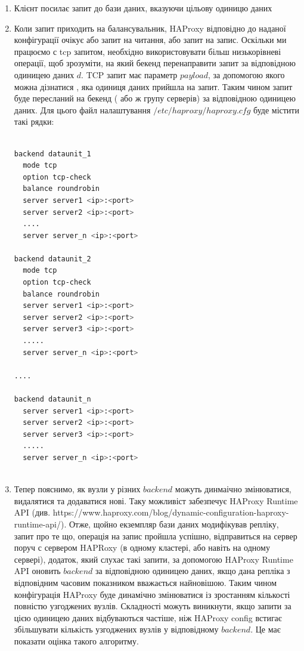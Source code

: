 \documentclass[14pt]{vakthesis}
\begin{document}
\begin{enumerate}

\item Клієнт посилає запит до бази даних, вказуючи цільову одиницю даних
\item Коли запит приходить на балансувальник, HAProxy відповідно до наданої конфігурації очікує або запит на читання, або запит на запис. Оскільки ми працюємо  с tcp запитом, необхідно використовувати більш низькорівневі операції, щоб зрозуміти, на який бекенд перенаправити запит за відповідною одиницею даних $d$. TCP запит має параметр $payload$, за допомогою якого можна дізнатися , яка одиниця даних прийшла на запит. Таким чином запит буде пересланий на бекенд (
або ж групу серверів) за відповідною одиницею даних. Для цього файл налаштування $/etc/haproxy/haproxy.cfg$ буде містити такі рядки: 

\begin{lstlisting}[language=bash,caption={bash version}]

backend dataunit_1
  mode tcp
  option tcp-check
  balance roundrobin
  server server1 <ip>:<port>
  server server2 <ip>:<port>
  ....
  server server_n <ip>:<port>

backend dataunit_2
  mode tcp
  option tcp-check
  balance roundrobin
  server server1 <ip>:<port>
  server server2 <ip>:<port>
  server server3 <ip>:<port>
  .....
  server server_n <ip>:<port>
 
....

backend dataunit_n
  server server1 <ip>:<port>
  server server2 <ip>:<port>
  server server3 <ip>:<port>
  .....
  server server_n <ip>:<port>
 

\end{lstlisting}

\item Тепер пояснимо, як вузли у різних $backend$ можуть динмаічно змінюватися, видалятися та додаватися нові. Таку можливіст забезпечує HAProxy Runtime API (див. https://www.haproxy.com/blog/dynamic-configuration-haproxy-runtime-api/). Отже, щойно екземпляр бази даних модифікував репліку, запит про те що, операція на запис пройшла успішно, відправиться на сервер поруч с сервером HAPRoxy (в одному кластері, або навіть на одному сервері), додаток, який слухає такі запити, за допомогою HAProxy Runtime API оновить $backend$ за відповідною одиницею даних, якщо дана репліка з відповідним часовим показником вважається найновішою. Таким чином конфігурація HAProxy буде динамічно змінюватися із зростанням кількості повністю узгоджених вузлів. Складності можуть виникнути, якщо запити за цією одиницею даних 
відбуваються частіше, ніж HAProxy config встигає збільшувати кількість узгоджених вузлів у відповідному $backend$. Це має показати оцінка такого алгоритму.
 

\end{enumerate}
\end{document}
